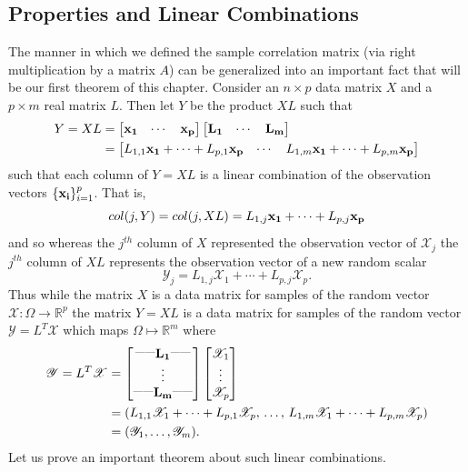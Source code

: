 \documentclass{book}
\newcommand{\bs}[1]{\boldsymbol{#1}}
\newcommand{\rv}[1]{\bs{\mathscr{#1}}}
\begin{document}
\subsection{Properties and Linear Combinations}

The manner in which we defined the sample correlation matrix (via right multiplication by a matrix $A$) can be generalized into an important fact that will be our first theorem of this chapter. Consider an $n \times p$ data matrix $X$ and a $p \times m$ real matrix $L$. Then let $Y$ be the product $XL$ such that 
$$
\begin{aligned}
Y=XL&=
\begin{bmatrix}
{\bf x_1}& \cdots& {\bf x_p}
\end{bmatrix}
\begin{bmatrix}
{\bf L_1}& \cdots& {\bf L_m}
\end{bmatrix}\\
&=
\begin{bmatrix}
L_{1,1}{\bf x_1}+\cdots+L_{p,1}{\bf x_p}& \cdots& L_{1,m}{\bf x_1}+\cdots+L_{p,m}{\bf x_p}
\end{bmatrix}
\end{aligned}
$$
such that each column of $Y=XL$ is a linear combination of the observation vectors $\{{\bf x_i}\}_{i=1}^{p}$. That is,
$$
col(j,Y)=col(j,XL)=L_{1,j}{\bf x_1}+\cdots+L_{p,j}{\bf x_p}
$$
and so whereas the $j^{th}$ column of $X$ represented the observation vector of $\mathscr{X}_j$ the $j^{th}$ column of $XL$ represents the observation vector of a new random scalar
$$
\mathscr{Y}_j=L_{1,j}\mathscr{X}_1+\cdots+L_{p,j}\mathscr{X}_p.
$$
Thus while the matrix $X$ is a data matrix for samples of the random vector $\rv{X}:\Omega\rightarrow\mathbb{R}^p$ the matrix $Y=XL$ is a data matrix for samples of the random vector $\rv{Y}=L^T\rv{X}$ which maps $\Omega\mapsto\mathbb{R}^m$ where
$$
\begin{aligned}
\rv{Y}=L^T\rv{X}&=\begin{bmatrix}\overset{\text{------}}{\hfill}{\bf L_1}\overset{\text{------}}{\hfill}\\  \vdots \\  \overset{\text{------}}{\hfill}{\bf L_m} \overset{\text{------}}{\hfill}\end{bmatrix}\begin{bmatrix}\mathscr{X}_1\\\vdots\\\mathscr{X}_p\end{bmatrix}\\
&=(L_{1,1}\mathscr{X}_1+\cdots+L_{p,1}\mathscr{X}_p,\,\ldots,\, L_{1,m}\mathscr{X}_1+\cdots+L_{p,m}\mathscr{X}_p)\\
&=(\mathscr{Y}_1,\ldots,\mathscr{Y}_m).
\end{aligned}
$$
Let us prove an important theorem about such linear combinations.
\end{document}
